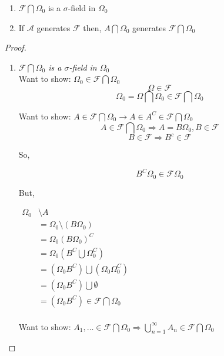 \documentclass[11pt,fleqn]{book} %
\begin{document}
\begin{theorem}
	\begin{enumerate}[label = (\roman*)]
		\item $\mathcal{F} \bigcap \Omega_0$ is a $\sigma$-field in $\Omega_0$
		\item If $\mathcal{A}$ generates $\mathcal{F}$ then, $A \bigcap \Omega_0$ generates $\mathcal{F} \bigcap \Omega_0$
	\end{enumerate}
\end{theorem}

\begin{proof}
	\begin{enumerate}[label = (\roman*)]
		\item \textit{$\mathcal{F} \bigcap \Omega_0$ is a $\sigma$-field in $\Omega_0$}\\

			Want to show: $\Omega_0 \in \mathcal{F} \bigcap \Omega_0$\\

				$$\Omega \in \mathcal{F} $$
				$$\Omega_0 = \Omega \bigcap \Omega_0 \in \mathcal{F} \bigcap \Omega_0 $$

			Want to show: $A \in \mathcal{F} \bigcap \Omega_0 \rightarrow A \in A^C \in \mathcal{F} \bigcap \Omega_0$ \\

				$$A \in \mathcal{F} \bigcap \Omega_0 \Rightarrow A = B\Omega_0, B \in \mathcal{F} $$
				$$B \in \mathcal{F} \Rightarrow B^c \in \mathcal{F} $$

				So, 

				$$B^C \Omega_0 \in \mathcal{F} \Omega_0$$

				But, 

				$\begin{aligned}
							\Omega_0 &\setminus A	\\
							&= 	\Omega_0 \setminus (B\Omega_0)\\
							&= 	\Omega_0 (B\Omega_0)^C\\
							&= 	\Omega_0 (B^C \bigcup \Omega_0^C)\\
							&= 	(\Omega_0B^C) \bigcup (\Omega_0\Omega_0^C)\\
							&= (\Omega_0B^C) \bigcup \emptyset \\
							&= (\Omega_0B^C) \in \mathcal{F}\bigcap \Omega_0
				\end{aligned}$\\
				\\
					
		Want to show: $A_1, \dots \in \mathcal{F} \bigcap \Omega_0 \Rightarrow \bigcup^\infty_{n=1} A_n \in \mathcal{F} \bigcap \Omega_0 $


\end{enumerate}
\end{proof}
\end{document}

